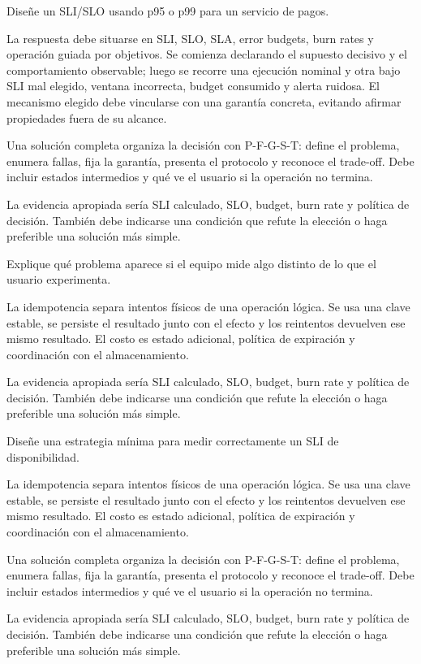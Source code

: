 \documentclass[variant=guia,cover=institutional,mode=screen]{ua-engineering-v6-article}
\begin{document}
\begin{uaexercise}
Diseñe un SLI/SLO usando p95 o p99 para un servicio de pagos.
\end{uaexercise}
\begin{uaanswer}
La respuesta debe situarse en SLI, SLO, SLA, error budgets, burn rates y operación guiada por objetivos. Se comienza declarando el supuesto decisivo y el comportamiento observable; luego se recorre una ejecución nominal y otra bajo SLI mal elegido, ventana incorrecta, budget consumido y alerta ruidosa. El mecanismo elegido debe vincularse con una garantía concreta, evitando afirmar propiedades fuera de su alcance.

Una solución completa organiza la decisión con P-F-G-S-T: define el problema, enumera fallas, fija la garantía, presenta el protocolo y reconoce el trade-off. Debe incluir estados intermedios y qué ve el usuario si la operación no termina.

La evidencia apropiada sería SLI calculado, SLO, budget, burn rate y política de decisión. También debe indicarse una condición que refute la elección o haga preferible una solución más simple.
\end{uaanswer}

\begin{uaexercise}
Explique qué problema aparece si el equipo mide algo distinto de lo que el usuario experimenta.
\end{uaexercise}
\begin{uaanswer}
La idempotencia separa intentos físicos de una operación lógica. Se usa una clave estable, se persiste el resultado junto con el efecto y los reintentos devuelven ese mismo resultado. El costo es estado adicional, política de expiración y coordinación con el almacenamiento.

La evidencia apropiada sería SLI calculado, SLO, budget, burn rate y política de decisión. También debe indicarse una condición que refute la elección o haga preferible una solución más simple.
\end{uaanswer}

\begin{uaexercise}
Diseñe una estrategia mínima para medir correctamente un SLI de disponibilidad.
\end{uaexercise}
\begin{uaanswer}
La idempotencia separa intentos físicos de una operación lógica. Se usa una clave estable, se persiste el resultado junto con el efecto y los reintentos devuelven ese mismo resultado. El costo es estado adicional, política de expiración y coordinación con el almacenamiento.

Una solución completa organiza la decisión con P-F-G-S-T: define el problema, enumera fallas, fija la garantía, presenta el protocolo y reconoce el trade-off. Debe incluir estados intermedios y qué ve el usuario si la operación no termina.

La evidencia apropiada sería SLI calculado, SLO, budget, burn rate y política de decisión. También debe indicarse una condición que refute la elección o haga preferible una solución más simple.
\end{uaanswer}
\end{document}
